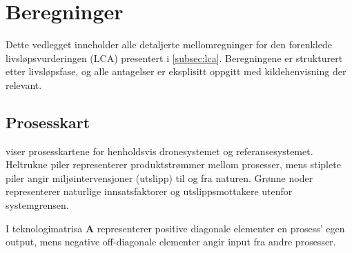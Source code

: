 \section{Beregninger}
\label{app:beregninger}

Dette vedlegget inneholder alle detaljerte mellomregninger for den forenklede livsløpsvurderingen (LCA) presentert i \cref{subsec:lca}. Beregningene er strukturert etter livsløpsfase, og alle antagelser er eksplisitt oppgitt med kildehenvisning der relevant.

\subsection{Prosesskart}

 viser prosesskartene for henholdsvis dronesystemet og referansesystemet. Heltrukne piler representerer produktstrømmer mellom prosesser, mens stiplete piler angir miljøintervensjoner (utslipp) til og fra naturen. Grønne noder representerer naturlige innsatsfaktorer og utslippsmottakere utenfor systemgrensen.

I teknologimatrisa $\mathbf{A}$ representerer positive diagonale elementer en prosess' egen output, mens negative off-diagonale elementer angir input fra andre prosesser.

